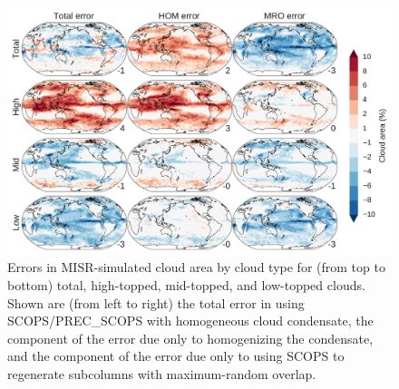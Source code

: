 \begin{figure}
\centering
\includegraphics[width=\columnwidth]{graphics/cldmisr_mro-hom_errors.pdf}
\caption{Errors in MISR-simulated cloud area by cloud type for (from top to bottom) total, high-topped, mid-topped, and low-topped clouds. Shown are (from left to right) the total error in using SCOPS/PREC\_SCOPS with homogeneous cloud condensate, the component of the error due only to homogenizing the condensate, and the component of the error due only to using SCOPS to regenerate subcolumns with maximum-random overlap.}
\label{sg_cldmisr_maps_diff}
\end{figure}

